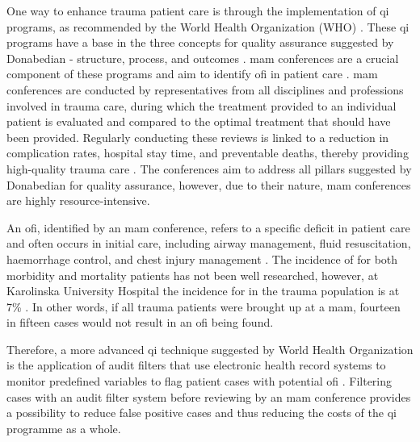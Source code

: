 \documentclass[12pt, a4paper]{article}
\begin{document}
One way to enhance trauma patient care is through the implementation of \acrfull{qi} programs, as recommended by the World Health Organization (WHO) \cite{world_health_organization_guidelines_2009}. These \acrshort{qi} programs have a base in the three concepts for quality assurance suggested by Donabedian - structure, process, and outcomes \cite{donabedian_effectiveness_1996}. \Acrfull{mam}  conferences are a crucial component of these programs and aim to identify \acrfull{ofi} in patient care \cite{santana_development_2014}. \acrshort{mam} conferences are conducted by representatives from all disciplines and professions involved in trauma care, during which the treatment provided to an individual patient is evaluated and compared to the optimal treatment that should have been provided. Regularly conducting these reviews is linked to a reduction in complication rates, hospital stay time, and preventable deaths, thereby providing high-quality trauma care \cite{stelfox_evidence_2011, mcdermott_trauma_1994}. The conferences aim to address all pillars suggested by Donabedian for quality assurance, however, due to their nature, \acrshort{mam} conferences are highly resource-intensive.

An \acrshort{ofi}, identified by an \acrshort{mam} conference, refers to a specific deficit in patient care and often occurs in initial care, including airway management, fluid resuscitation, haemorrhage control, and chest injury management \cite{world_health_organization_guidelines_2009,roy_learning_2017,oreilly_opportunities_2013,sanddal_analysis_2011}. The incidence of  for both morbidity and mortality patients has not been well researched, however, at Karolinska University Hospital the incidence for  in the trauma population is at 7\% \cite{attergrim_predicting_2023}. In other words, if all trauma patients were brought up at a \acrshort{mam}, fourteen in fifteen cases would not result in an \acrshort{ofi} being found.

Therefore, a more advanced \acrshort{qi} technique suggested by World Health Organization is the application of audit filters that use electronic health record systems to monitor predefined variables to flag patient cases with potential \acrfull{ofi} \cite{world_health_organization_guidelines_2009}. Filtering cases with an audit filter system before reviewing by an \acrshort{mam} conference provides a possibility to reduce false positive cases and thus reducing the costs of the \acrshort{qi} programme as a whole.
\end{document}
